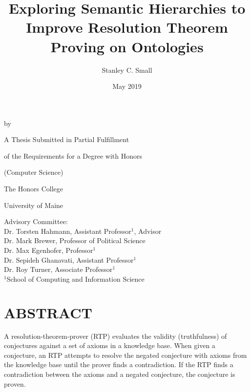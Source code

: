 \documentclass{article}
\title{Exploring Semantic Hierarchies to Improve Resolution Theorem Proving on Ontologies}
\author{Stanley C. Small}
\date{May 2019}
\begin{document}
\begin{titlepage}
	\makeatletter
		\begin{center}
   				\MakeUppercase{\@title} \par
  				\smallskip 
 				\vspace{.15in} by \par
 				\smallskip
  				\vspace{.15in} \@author \par
  				\vspace{1in}
 				A Thesis Submitted in Partial Fulfillment  \par
  				of the Requirements for a Degree with Honors \par
  				(Computer Science) \par
  				\vspace{.75in}
  				The Honors College \par
  				University of Maine \par
  				\@date \par
 				\vfill
   		\end{center}
	\makeatother
	\begin{flushleft}
		Advisory Committee: \\
		\hspace{.3in} Dr. Torsten Hahmann, Assistant Professor$^{1}$, Advisor \\
		\hspace{.3in} Dr. Mark Brewer, Professor of Political Science \\
		\hspace{.3in} Dr. Max Egenhofer, Professor$^{1}$ \\
		\hspace{.3in} Dr. Sepideh Ghanavati, Assistant Professor$^{1}$ \\
		\hspace{.3in} Dr. Roy Turner, Associate Professor$^{1}$ \\
		\hfill \break
		\hspace{.3in} $^{1}$School of Computing and Information Science
	\end{flushleft}
\end{titlepage}

\newpage
{}
\vspace*{.05in}
\section*{\MakeUppercase{Abstract}}
A resolution-theorem-prover (RTP) evaluates the validity (truthfulness) of conjectures against a set of axioms in a knowledge base. When given a conjecture, an RTP attempts to resolve the negated conjecture with axioms from the knowledge base until the prover finds a contradiction. If the RTP finds a contradiction between the axioms and a negated conjecture, the conjecture is proven. 
\end{document}
